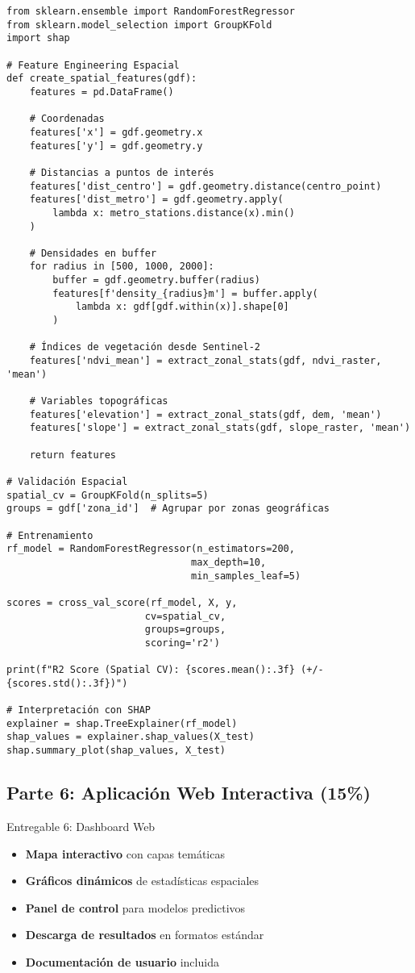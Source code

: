 \documentclass[12pt,a4paper]{article}
\begin{document}
\begin{verbatim}
from sklearn.ensemble import RandomForestRegressor
from sklearn.model_selection import GroupKFold
import shap

# Feature Engineering Espacial
def create_spatial_features(gdf):
    features = pd.DataFrame()

    # Coordenadas
    features['x'] = gdf.geometry.x
    features['y'] = gdf.geometry.y

    # Distancias a puntos de interés
    features['dist_centro'] = gdf.geometry.distance(centro_point)
    features['dist_metro'] = gdf.geometry.apply(
        lambda x: metro_stations.distance(x).min()
    )

    # Densidades en buffer
    for radius in [500, 1000, 2000]:
        buffer = gdf.geometry.buffer(radius)
        features[f'density_{radius}m'] = buffer.apply(
            lambda x: gdf[gdf.within(x)].shape[0]
        )

    # Índices de vegetación desde Sentinel-2
    features['ndvi_mean'] = extract_zonal_stats(gdf, ndvi_raster, 'mean')

    # Variables topográficas
    features['elevation'] = extract_zonal_stats(gdf, dem, 'mean')
    features['slope'] = extract_zonal_stats(gdf, slope_raster, 'mean')

    return features

# Validación Espacial
spatial_cv = GroupKFold(n_splits=5)
groups = gdf['zona_id']  # Agrupar por zonas geográficas

# Entrenamiento
rf_model = RandomForestRegressor(n_estimators=200,
                                max_depth=10,
                                min_samples_leaf=5)

scores = cross_val_score(rf_model, X, y,
                        cv=spatial_cv,
                        groups=groups,
                        scoring='r2')

print(f"R2 Score (Spatial CV): {scores.mean():.3f} (+/- {scores.std():.3f})")

# Interpretación con SHAP
explainer = shap.TreeExplainer(rf_model)
shap_values = explainer.shap_values(X_test)
shap.summary_plot(shap_values, X_test)
\end{verbatim}

\subsection{Parte 6: Aplicación Web Interactiva (15\%)}

\begin{deliverable}{Entregable 6: Dashboard Web}
\begin{itemize}
    \item \textbf{Mapa interactivo} con capas temáticas
    \item \textbf{Gráficos dinámicos} de estadísticas espaciales
    \item \textbf{Panel de control} para modelos predictivos
    \item \textbf{Descarga de resultados} en formatos estándar
    \item \textbf{Documentación de usuario} incluida
\end{itemize}
\end{deliverable}
\end{document}
